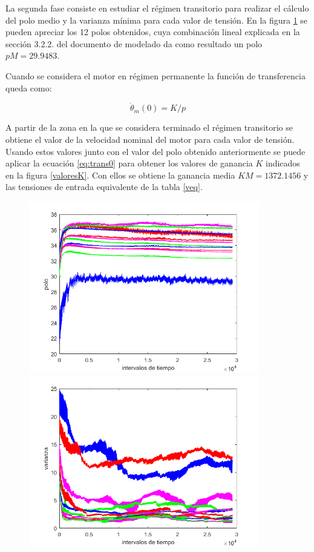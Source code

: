 \documentclass[a4paper]{article}
\begin{document}
La segunda fase consiste en estudiar el régimen transitorio para realizar el cálculo del polo medio y la varianza mínima para cada valor de tensión.
En la figura \ref{polos} se pueden apreciar los 12 polos obtenidos, cuya combinación lineal explicada en la sección 3.2.2. del documento de modelado\cite{modelado}
da como resultado un polo $pM=29.9483$.

Cuando se considera el motor en régimen permanente la función de transferencia queda como:

\begin{equation}
	\label{eq:trans0}
	\dot{\theta}_m (0) = K/p
\end{equation}

A partir de la zona en la que se considera terminado el régimen transitorio se obtiene el valor de la velocidad nominal del motor para cada valor de tensión.
Usando estos valores junto con el valor del polo obtenido anteriormente se puede aplicar la ecuación \ref{eq:trans0} para obtener los valores de ganancia $K$ indicados en la
figura \ref{valoresK}.
Con ellos se obtiene la ganancia media $KM=1372.1456$ y las tensiones de entrada equivalente de la tabla \ref{veq}.

\begin{figure}[htbp]
	\begin{center}
		\includegraphics[width=10cm]{polos}
		\includegraphics[width=10cm]{varianza}
	\end{center}
	\caption{}
	\label{polos}
\end{figure}
\end{document}
